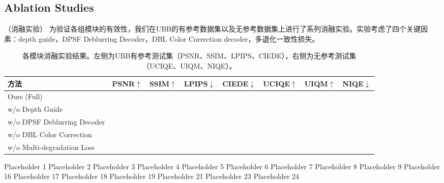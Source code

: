 \documentclass[twocolumn]{article}
\begin{document}
\subsection{Ablation Studies}
（消融实验）
为验证各组模块的有效性，我们在UBB的有参考数据集以及无参考数据集上进行了系列消融实验。实验考虑了四个关键因素：depth guide，DPSF Deblurring Decoder，DBL Color Correction decoder，多退化一致性损失。
\begin{table}[htbp]
  \centering
  \small
  \setlength{\tabcolsep}{5pt}
  \caption{各模块消融实验结果。左侧为UBB有参考测试集（PSNR、SSIM、LPIPS、CIEDE），右侧为无参考测试集（UCIQE、UIQM、NIQE）。}
  \label{tab:ablation}
  \begin{tabular}{lcccc|ccc}
    \toprule
    方法 & PSNR$\uparrow$ & SSIM$\uparrow$ & LPIPS$\downarrow$ & CIEDE$\downarrow$ & UCIQE$\uparrow$ & UIQM$\uparrow$ & NIQE$\downarrow$ \\
    \midrule
    Ours (Full)                 &       &       &       &       &       &       &       \\
    w/o Depth Guide             &       &       &       &       &       &       &       \\
    w/o DPSF Deblurring Decoder &       &       &       &       &       &       &       \\
    w/o DBL Color Correction    &       &       &       &       &       &       &       \\
    w/o Multi-degradation Loss  &       &       &       &       &       &       &       \\
    \bottomrule
  \end{tabular}
\end{table}



\begin{thebibliography}{99}
 Placeholder 1
 Placeholder 2
 Placeholder 3
 Placeholder 4
 Placeholder 5
 Placeholder 6
 Placeholder 7
 Placeholder 8
 Placeholder 9
 Placeholder 16
 Placeholder 17
 Placeholder 18
 Placeholder 19
 Placeholder 21
 Placeholder 23
 Placeholder 24
\end{thebibliography}

\end{document}
